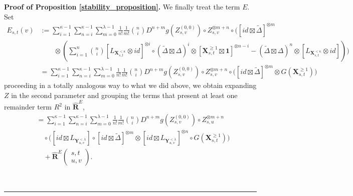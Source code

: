 \documentclass{article}%
\newenvironment{proof}[1][Proof]{\noindent\textbf{#1.} }{\ \rule{0.5em}{0.5em}}
\begin{document}
\begin{proof}[Proof of Proposition \ref{stability_proposition}]
We finally treat the term $E$. Set
\begin{align*}
E_{s,t}(v)
&:=
\sum_{i = 1}^{\kappa -1} \sum_{n = i}^{\kappa -1} \sum_{m = 0}^{\lambda -1}  \frac{1}{n!} \frac{1}{m!} \binom{n}{i} D^{n+m}g(Z^{(0,0)}_{s,v})\circ Z^{\otimes m + n}_{s,v} \circ \Bigg(  \left[ id \boxtimes \tilde{\Delta}\right]^{\otimes m}   \\
&\qquad \otimes \left(\sum_{i = 1}^{n}\binom{n}{i} [L_{\mathbf{X}^{<\kappa}_{s,t}} \otimes id]^{\otimes i } \circ (\tilde{\Delta} \boxtimes \Delta)^{i}  \otimes \left[\mathbf{X}^{\ge 1}_{s,t} \boxtimes \mathbf{1} \right]^{\otimes n-i} - (\tilde{\Delta} \boxtimes \Delta)^{n}  \otimes [L_{\mathbf{X}^{<\kappa}_{s,t}} \otimes id] \right)\Bigg)\\ 
&= \sum_{i = 1}^{\kappa -1} \sum_{n = i}^{\kappa -1} \sum_{m = 0}^{\lambda -1}  \frac{1}{n!} \frac{1}{m!} \binom{n}{i} D^{n+m}g(Z^{(0,0)}_{s,v})\circ Z^{\otimes m + n}_{s,v} \circ \Bigg(  \left[ id \boxtimes \tilde{\Delta}\right]^{\otimes m} \otimes  G(\mathbf{X}^{\geq 1}_{s,t})\Bigg)
\end{align*}
proceeding in a totally analogous way to what we did above, we obtain expanding $Z$ in the second parameter and grouping the terms that present at least one remainder term $R^2$ in $\hat{\mathbf{R}}^{E}$,
\begin{align*}
&=
\sum_{i=1}^{\kappa-1} \sum_{n=i}^{\kappa-1} \sum_{m=0}^{\lambda-1} 
\frac{1}{n!} \frac{1}{m!} \binom{n}{i}
D^{n+m} g(Z^{(0,0)}_{s,v}) \circ Z^{\otimes m+n}_{s,u} \\
&\quad \circ
\Bigg(
    \left[ id \boxtimes L_{\mathbf{Y}^{<\lambda}_{u,v}} \right]
    \circ \left[ id \boxtimes \tilde{\Delta} \right]^{\otimes m}  \otimes
    \left[ id \boxtimes L_{\mathbf{Y}^{<\lambda}_{u,v}} \right]^{\otimes n}
    \circ G(\mathbf{X}^{\ge 1}_{s,t})
\Bigg) \\
&\quad
+ \hat{\mathbf{R}}^{E} \begin{pmatrix} s,t \\ u,v \end{pmatrix} .
\end{align*}


\end{proof}
\end{document}
